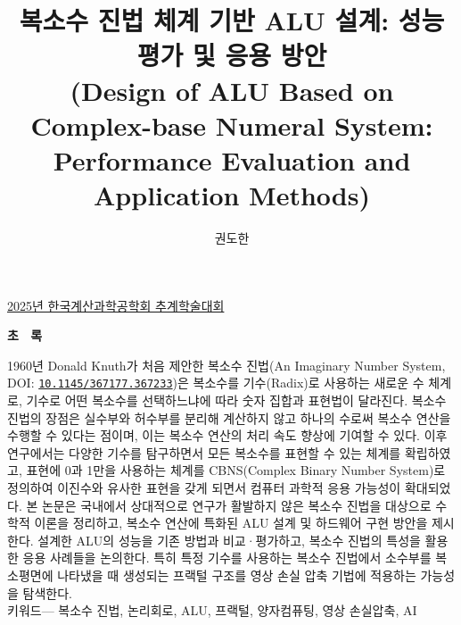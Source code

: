 \documentclass[10pt,a4paper,notitlepage]{report}
\title{\Huge \noindent \textbf{복소수 진법 체계 기반 ALU 설계: 성능 평가 및 응용 방안} \\ \LARGE (Design of ALU Based on Complex-base Numeral System: Performance Evaluation and Application Methods)}
\author[1]{\vspace{2mm} 권도한}
\affil[1]{\small 안동고등학교 (Mail: me@dohan.in)}
\date{}
\providecommand{\keywords}[2][키워드]{#1--- #2}
\renewenvironment{abstract}[1][초 \-\ 록]
  {
   \begin{center}
     \large\textbf{#1}
     \vspace{-0.3cm}
   \end{center}
   \noindent\hspace{\parindent}%
  }
  {\par\medskip}
\begin{document}
\begin{center}
	\underline{2025년 한국계산과학공학회 추계학술대회}
\end{center}
\vspace{\fill}
{\let\newpage\relax\maketitle}
\thispagestyle{empty}
\vspace{\fill}
\begin{abstract}
	1960년 Donald Knuth가 처음 제안한 복소수 진법(An Imaginary Number System, DOI: \href{https://doi.org/10.1145/367177.367233}{\nolinkurl{10.1145/367177.367233}})은 복소수를 기수(Radix)로 사용하는 새로운 수 체계로, 기수로 어떤 복소수를 선택하느냐에 따라 숫자 집합과 표현법이 달라진다. 복소수 진법의 장점은 실수부와 허수부를 분리해 계산하지 않고 하나의 수로써 복소수 연산을 수행할 수 있다는 점이며, 이는 복소수 연산의 처리 속도 향상에 기여할 수 있다. 이후 연구에서는 다양한 기수를 탐구하면서 모든 복소수를 표현할 수 있는 체계를 확립하였고, 표현에 0과 1만을 사용하는 체계를 CBNS(Complex Binary Number System)로 정의하여 이진수와 유사한 표현을 갖게 되면서 컴퓨터 과학적 응용 가능성이 확대되었다. 본 논문은 국내에서 상대적으로 연구가 활발하지 않은 복소수 진법을 대상으로 수학적 이론을 정리하고, 복소수 연산에 특화된 ALU 설계 및 하드웨어 구현 방안을 제시한다. 설계한 ALU의 성능을 기존 방법과 비교·평가하고, 복소수 진법의 특성을 활용한 응용 사례들을 논의한다. 특히 특정 기수를 사용하는 복소수 진법에서 소수부를 복소평면에 나타냈을 때 생성되는 프랙털 구조를 영상 손실 압축 기법에 적용하는 가능성을 탐색한다. \\
	\hspace*{24pt}\keywords{복소수 진법, 논리회로, ALU, 프랙털, 양자컴퓨팅, 영상 손실압축, AI}
\end{abstract}
\newpage
\thispagestyle{empty}
{\let\newpage\relax\tableofcontents}
\thispagestyle{fancy}
\pagestyle{fancy}
\fancyhf{}
\fancyfoot[R]{\thepage}
\vspace{3cm}
\end{document}
